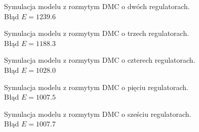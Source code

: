 \begin{figure}[ht]
\centering

\caption{Symulacja modelu z rozmytym DMC o dwóch regulatorach. \\
	Błąd $ E=\num{1239,6} $}
\label{Z6a}
\end{figure}

\begin{figure}[ht]
\centering

\caption{Symulacja modelu z rozmytym DMC o trzech regulatorach. \\
	Błąd $ E=\num{1188,3} $}
\label{Z6b}
\end{figure}

\begin{figure}[ht]
\centering

\caption{Symulacja modelu z rozmytym DMC o czterech regulatorach. \\
	Błąd $ E=\num{1028,0} $}
\label{Z6c}
\end{figure}

\begin{figure}[ht]
\centering

\caption{Symulacja modelu z rozmytym DMC o pięciu regulatorach. \\
	Błąd $ E=\num{1007.5} $}
\label{Z6d}
\end{figure}

\begin{figure}[ht]
\centering

\caption{Symulacja modelu z rozmytym DMC o sześciu regulatorach. \\
	Błąd $ E=\num{1007.7} $}
\label{Z6e}
\end{figure}